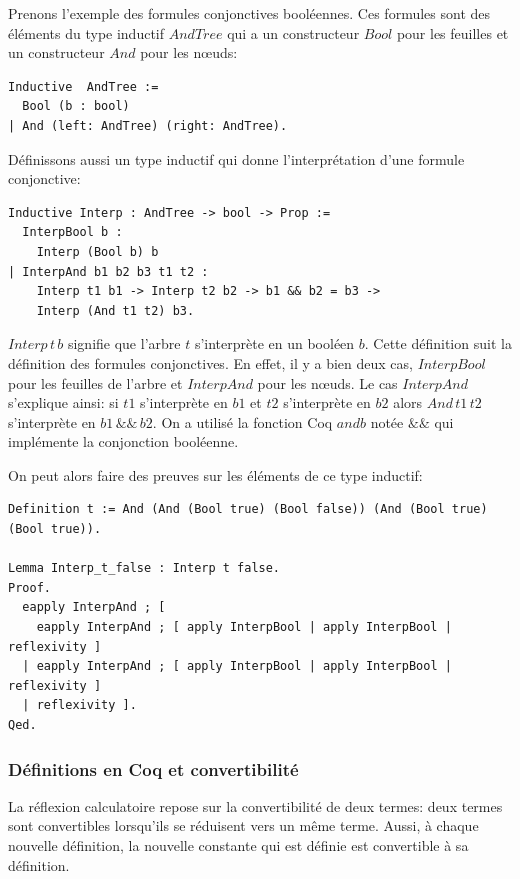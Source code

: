 \documentclass[11pt]{article}
\begin{document}
Prenons l'exemple des formules conjonctives booléennes. Ces formules sont des éléments du type inductif $AndTree$ qui a un constructeur $Bool$ pour les feuilles et un constructeur $And$ pour les nœuds: 

\begin{lstlisting}[frame=single]
Inductive  AndTree := 
  Bool (b : bool) 
| And (left: AndTree) (right: AndTree).
\end{lstlisting}

Définissons aussi un type inductif qui donne l'interprétation d'une formule conjonctive: 

\begin{lstlisting}[frame=single]
Inductive Interp : AndTree -> bool -> Prop :=
  InterpBool b :
    Interp (Bool b) b
| InterpAnd b1 b2 b3 t1 t2 :
    Interp t1 b1 -> Interp t2 b2 -> b1 && b2 = b3 ->
    Interp (And t1 t2) b3.
\end{lstlisting}
$Interp \, t \, b$ signifie que l'arbre $t$ s'interprète en un booléen $b$. Cette définition suit la définition des formules conjonctives. En effet, il y a bien deux cas, $InterpBool$ pour les feuilles de l'arbre et $InterpAnd$ pour les nœuds. Le cas $InterpAnd$ s'explique ainsi: si $t1$ s'interprète en $b1$ et $t2$ s'interprète en $b2$ alors $And \, t1 \, t2$ s'interprète en $b1\,\&\&\,b2$.  On a utilisé la fonction Coq $andb$ notée $\&\&$ qui implémente la conjonction booléenne.

On peut alors faire des preuves sur les éléments de ce type inductif: 
\begin{lstlisting}[frame=single]
Definition t := And (And (Bool true) (Bool false)) (And (Bool true) (Bool true)).

Lemma Interp_t_false : Interp t false.
Proof.
  eapply InterpAnd ; [
    eapply InterpAnd ; [ apply InterpBool | apply InterpBool | reflexivity ]
  | eapply InterpAnd ; [ apply InterpBool | apply InterpBool | reflexivity ]
  | reflexivity ].
Qed.
\end{lstlisting}

\subsubsection{Définitions en Coq et convertibilité}

La réflexion calculatoire repose sur la convertibilité de deux termes: deux termes sont convertibles lorsqu'ils se réduisent vers un même terme. Aussi, à chaque nouvelle définition, la nouvelle constante qui est définie est convertible à sa définition. \\
\end{document}
